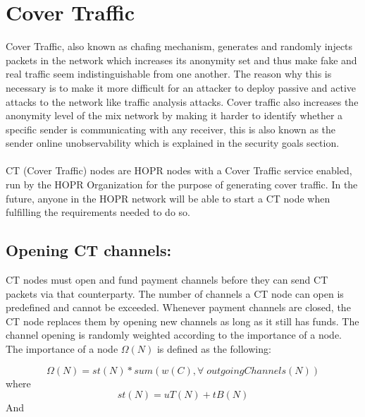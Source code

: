 \section{Cover Traffic}


Cover Traffic, also known as chafing mechanism, generates and randomly injects packets in the network which increases its anonymity set and thus make fake and real traffic seem indistinguishable from one another. The reason why this is necessary is to make it more difficult for an attacker to deploy passive and active attacks to the network like traffic analysis attacks.
Cover traffic also increases the anonymity level of the mix network by making it harder to identify whether a specific sender is communicating with any receiver, this is also known as the sender online unobservability which is explained in the security goals section.
\\~\\ CT (Cover Traffic) nodes are HOPR nodes with a Cover Traffic service enabled, run by the HOPR Organization for the purpose of generating cover traffic. In the future, anyone in the HOPR network will be able to start a CT node when fulfilling the requirements needed to do so.
\subsection{Opening CT channels:} 
CT nodes must open and fund payment channels before they can send CT packets via that counterparty. The number of channels a CT node can open is predefined and cannot be exceeded. Whenever payment channels are closed, the CT node replaces them by opening new channels as long as it still has funds. 
The channel opening is randomly weighted according to the importance of a node. The importance of a node $\Omega(N)$ is defined as the following:

$$\Omega(N) = st(N) * sum(w(C), \forall \; outgoingChannels(N))$$
where 
$$st(N) = uT(N) + tB(N)$$
And 

